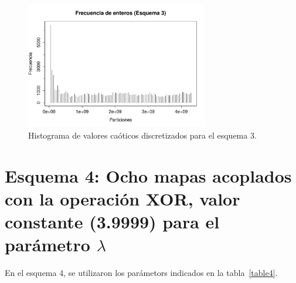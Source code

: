 \documentclass[preprint]{elsarticle}
\begin{document}
\begin{figure}[H]
\centering
\includegraphics[width=8cm]{cori.pdf}
\caption{Histograma de valores caóticos discretizados para el esquema 3.}
\label{mama}
\end{figure}








\section{Esquema 4: \textbf{Ocho mapas acoplados con la operación XOR, valor constante (3.9999) para el parámetro $\lambda$}}
\label{esq4}

En el esquema 4, se utilizaron los parámetors indicados en la tabla~\ref{table4}.
\begin{table}[H]
\centering
{}
\caption{Valores para cada uno de los mapas utilizados en el esquema 4.}
\label{table4}
\end{table}
\end{document}
